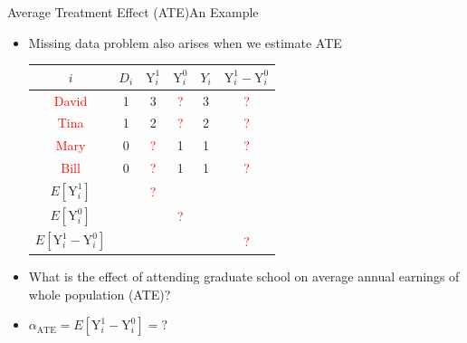 \documentclass[hyperref={pdfpagelabels=false}]{beamer}
\begin{document}
\begin{frame}{Average Treatment Effect (ATE)}{An Example}
\begin{itemize}
\item Missing data problem also arises when we estimate ATE
\vspace{0.2cm} 
\begin{center}
	\begin{threeparttable}
		\centering\footnotesize
		\begin{tabular}{cccccc}
			\toprule
			$i$ & $D_i$ & $\mathrm{Y}^{1}_{i}$ & $\mathrm{Y}^{0}_{i}$ & $Y_i$ & $\mathrm{Y}^{1}_{i}-\mathrm{Y}^{0}_{i}$  \\
			\midrule
			\textcolor{red}{David} & 1 & 3 & \textcolor{red}? & 3 & \textcolor{red}? \\
			\textcolor{red}{Tina} & 1 & 2 & \textcolor{red}? & 2 & \textcolor{red}? \\
			\textcolor{red}{Mary} & 0 & \textcolor{red}? & 1 & 1 & \textcolor{red}? \\
			\textcolor{red}{Bill} & 0 & \textcolor{red}? & 1 & 1 & \textcolor{red}? \\
			\midrule
			$E[\mathrm{Y}^{1}_{i}]$     &  & \textcolor{red}? &     &  &     \\
			$E[\mathrm{Y}^{0}_{i}]$     &  &     & \textcolor{red}? &  &     \\
			\midrule
			$E[\mathrm{Y}^{1}_{i}-\mathrm{Y}^{0}_{i}]$ &  &     &     &  & \textcolor{red}? \\
			\bottomrule
		\end{tabular}
	\end{threeparttable}
\end{center}

\vspace{0.2cm}
\item What is the effect of attending graduate school on average annual earnings of whole population (ATE)?
\vspace{0.2cm}
\item $\alpha_{\text{ATE}}=E[\mathrm{Y}^{1}_{i}-\mathrm{Y}^{0}_{i}]=?$
\end{itemize}

\end{frame}
\end{document}
